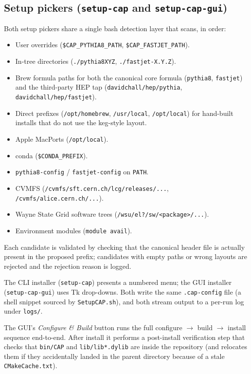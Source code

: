 \documentclass[11pt,a4paper]{article}
\begin{document}
\subsection{Setup pickers (\texttt{setup-cap} and \texttt{setup-cap-gui})}

Both setup pickers share a single bash detection layer that scans, in order:

\begin{itemize}[leftmargin=2em,itemsep=0pt]
  \item User overrides (\verb|$CAP_PYTHIA8_PATH|, \verb|$CAP_FASTJET_PATH|).
  \item In-tree directories (\texttt{./pythia8XYZ}, \texttt{./fastjet-X.Y.Z}).
  \item Brew formula paths for both the canonical core formula
        (\texttt{pythia8}, \texttt{fastjet}) and the third-party HEP tap
        (\texttt{davidchall/hep/pythia}, \texttt{davidchall/hep/fastjet}).
  \item Direct prefixes (\texttt{/opt/homebrew}, \texttt{/usr/local},
        \texttt{/opt/local}) for hand-built installs that do not use the
        keg-style layout.
  \item Apple MacPorts (\texttt{/opt/local}).
  \item conda (\verb|$CONDA_PREFIX|).
  \item \texttt{pythia8-config} / \texttt{fastjet-config} on \texttt{PATH}.
  \item CVMFS (\texttt{/cvmfs/sft.cern.ch/lcg/releases/...},
        \texttt{/cvmfs/alice.cern.ch/...}).
  \item Wayne State Grid software trees
        (\texttt{/wsu/el?/sw/<package>/...}).
  \item Environment modules (\texttt{module avail}).
\end{itemize}

\noindent
Each candidate is validated by checking that the canonical header file is
actually present in the proposed prefix; candidates with empty paths or
wrong layouts are rejected and the rejection reason is logged.

The CLI installer (\texttt{setup-cap}) presents a numbered menu; the GUI
installer (\texttt{setup-cap-gui}) uses Tk drop-downs. Both write the same
\texttt{.cap-config} file (a shell snippet sourced by \texttt{SetupCAP.sh}),
and both stream output to a per-run log under \texttt{logs/}.

The GUI's \emph{Configure \& Build} button runs the full configure $\to$
build $\to$ install sequence end-to-end. After install it performs a
post-install verification step that checks that \texttt{bin/CAP} and
\texttt{lib/lib*.dylib} are inside the repository (and relocates them if
they accidentally landed in the parent directory because of a stale
\texttt{CMakeCache.txt}).
\end{document}

